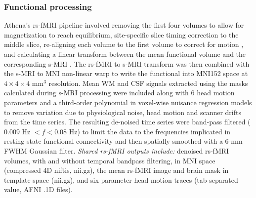 \documentclass[preprint,12pt,5p]{elsarticle}
\begin{document}
\begin{itemize}
\subsubsection{Functional processing} Athena's rs-fMRI pipeline involved removing the first four volumes to allow for magnetization to reach equilibrium, site-specific slice timing correction to the middle slice, re-aligning each volume to the first volume to correct for motion \cite{cox1999_motion}, and calculating a linear transform between the mean functional volume and the corresponding s-MRI \cite{jenkinson2002_flirt}. The rs-fMRI to s-MRI transform was then combined with the s-MRI to MNI non-linear warp to write the functional into MNI152 space at $4\times4\times4$ mm$^3$ resolution. Mean WM and CSF signals extracted using the masks calculated during s-MRI processing were included along with 6 head motion parameters and a third-order polynomial in voxel-wise nuisance regression models to remove variation due to physiological noise, head motion and scanner drifts from the time series\cite{lund2006_nvr,fox2005}. The resulting de-noised time series were band-pass filtered ($0.009$ Hz $< f < 0.08$ Hz) to limit the data to the frequencies implicated in resting state functional connectivity \cite{biswal1995,cordes2001} and then spatially smoothed with a 6-mm FWHM Gaussian filter. \emph{Shared rs-fMRI outputs include:} denoised rs-fMRI volumes, with and without temporal bandpass filtering, in MNI space (compressed 4D niftis, nii.gz), the mean rs-fMRI image and brain mask in template space (nii.gz), and six parameter head motion traces (tab separated value, AFNI .1D files). 


\end{itemize}
\end{document}
